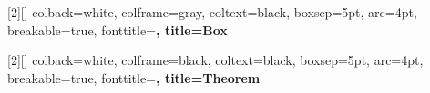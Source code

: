 \newenvironment{rmdblock}[1]
  {
  \begin{itemize}
  \renewcommand{\labelitemi}{
    \raisebox{-.7\height}[0pt][0pt]{
      {\setkeys{Gin}{width=3em,keepaspectratio}\texttt{[image: images/\#1]}}
    }
  }
  \setlength{\fboxsep}{1em}
  \begin{kframe}
  \item
  }
  {
  \end{kframe}
  \end{itemize}
  }
\newenvironment{rmdnote}
  {\begin{rmdblock}{note}}
  {\end{rmdblock}}
\newenvironment{rmdcaution}
  {\begin{rmdblock}{caution}}
  {\end{rmdblock}}
\newenvironment{rmdimportant}
  {\begin{rmdblock}{important}}
  {\end{rmdblock}}
\newenvironment{rmdtip}
  {\begin{rmdblock}{tip}}
  {\end{rmdblock}}
\newenvironment{rmdwarning}
  {\begin{rmdblock}{warning}}
  {\end{rmdblock}}

\usepackage{makeidx}
\makeindex


\usepackage{amsthm}
\makeatletter
\def\thm@space@setup{%
  \thm@preskip=8pt plus 2pt minus 4pt
  \thm@postskip=\thm@preskip
}
\makeatother

\usepackage[most]{tcolorbox}

[2][]{%
  colback=white,
  colframe=gray,
  coltext=black,
  boxsep=5pt,
  arc=4pt,
  breakable=true,
fonttitle=\bfseries, 
title=Box~\thetcbcounter}

[2][]{%
  colback=white,
  colframe=black,
  coltext=black,
  boxsep=5pt,
  arc=4pt,
  breakable=true,
fonttitle=\bfseries, 
title=Theorem~\thetcbcounter}


\frontmatter
